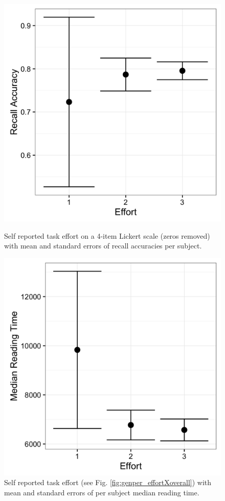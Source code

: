 \documentclass[a4paper,man,natbib,floatsintext,import]{apa6}
\begin{document}
\begin{figure}
\begin{minipage}[t]{.5\textwidth}
\includegraphics[width=.9\linewidth]{figures/genper_effortXoverall.png}
\caption{Self reported task effort on a 4-item Lickert scale (zeros removed) with mean and standard errors of recall accuracies per subject.}
\label{fig:genper_effortXoverall}
\end{minipage}
\begin{minipage}[t]{.5\textwidth}
\includegraphics[width=.9\linewidth]{figures/genper_effortXtime.png}
\caption{Self reported task effort (see Fig. \ref{fig:genper_effortXoverall}) with mean and standard errors of per subject median reading time.}
\label{fig:genper_effortXtime}
\end{minipage}
\end{figure}
\end{document}
